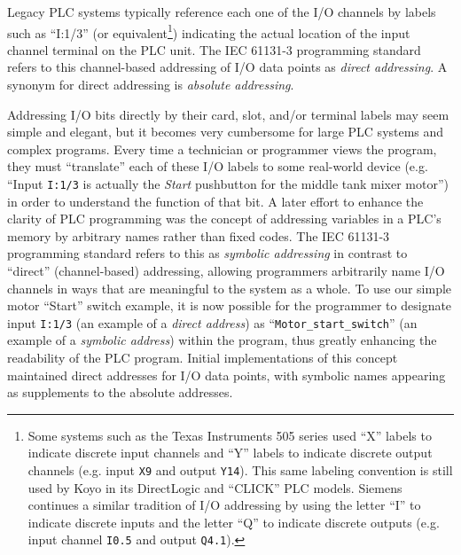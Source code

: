 Legacy PLC systems typically reference each one of the I/O channels by labels such as ``I:1/3'' (or equivalent\footnote{Some systems such as the Texas Instruments 505 series used ``X'' labels to indicate discrete input channels and ``Y'' labels to indicate discrete output channels (e.g. input \texttt{X9} and output \texttt{Y14}).  This same labeling convention is still used by Koyo in its DirectLogic and ``CLICK'' PLC models.  Siemens continues a similar tradition of I/O addressing by using the letter ``I'' to indicate discrete inputs and the letter ``Q'' to indicate discrete outputs (e.g. input channel \texttt{I0.5} and output \texttt{Q4.1}).}) indicating the actual location of the input channel terminal on the PLC unit.  The IEC 61131-3 programming standard refers to this channel-based addressing of I/O data points as \textit{direct addressing}.  A synonym for direct addressing is \textit{absolute addressing}.    

Addressing I/O bits directly by their card, slot, and/or terminal labels may seem simple and elegant, but it becomes very cumbersome for large PLC systems and complex programs.  Every time a technician or programmer views the program, they must ``translate'' each of these I/O labels to some real-world device (e.g. ``Input \texttt{I:1/3} is actually the \textit{Start} pushbutton for the middle tank mixer motor'') in order to understand the function of that bit.  A later effort to enhance the clarity of PLC programming was the concept of addressing variables in a PLC's memory by arbitrary names rather than fixed codes.  The IEC 61131-3 programming standard refers to this as \textit{symbolic addressing} in contrast to ``direct'' (channel-based) addressing, allowing programmers arbitrarily name I/O channels in ways that are meaningful to the system as a whole.  To use our simple motor ``Start'' switch example, it is now possible for the programmer to designate input \texttt{I:1/3} (an example of a \textit{direct address}) as ``\texttt{Motor\_start\_switch}'' (an example of a \textit{symbolic address}) within the program, thus greatly enhancing the readability of the PLC program.  Initial implementations of this concept maintained direct addresses for I/O data points, with symbolic names appearing as supplements to the absolute addresses.  

